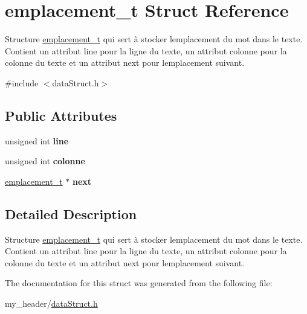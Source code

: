 \hypertarget{structemplacement__t}{}\section{emplacement\+\_\+t Struct Reference}
\label{structemplacement__t}


Structure \mbox{\hyperlink{structemplacement__t}{emplacement\+\_\+t}} qui sert à stocker l\textquotesingle{}emplacement du mot dans le texte. Contient un attribut line pour la ligne du texte, un attribut colonne pour la colonne du texte et un attribut next pour l\textquotesingle{}emplacement suivant.  




{\ttfamily \#include $<$data\+Struct.\+h$>$}

\subsection*{Public Attributes}
\begin{DoxyCompactItemize}
\item 
\mbox{\label{structemplacement__t_a1cb3cd582b29d7923803aab79f000476}} 
unsigned int {\bfseries line}
\item 
\mbox{\label{structemplacement__t_a6072c07b4db25f846eecd5a0f4abf132}} 
unsigned int {\bfseries colonne}
\item 
\mbox{\label{structemplacement__t_a47c1589ccd27fd0d139ce67761554c41}} 
\mbox{\hyperlink{structemplacement__t}{emplacement\+\_\+t}} $\ast$ {\bfseries next}
\end{DoxyCompactItemize}


\subsection{Detailed Description}
Structure \mbox{\hyperlink{structemplacement__t}{emplacement\+\_\+t}} qui sert à stocker l\textquotesingle{}emplacement du mot dans le texte. Contient un attribut line pour la ligne du texte, un attribut colonne pour la colonne du texte et un attribut next pour l\textquotesingle{}emplacement suivant. 

The documentation for this struct was generated from the following file\+:\begin{DoxyCompactItemize}
\item 
my\+\_\+header/\mbox{\hyperlink{dataStruct_8h}{data\+Struct.\+h}}\end{DoxyCompactItemize}
